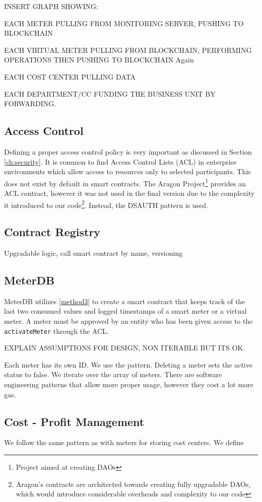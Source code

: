 INSERT GRAPH SHOWING:

EACH METER PULLING FROM MONITORING SERVER, PUSHING TO BLOCKCHAIN

EACH VIRTUAL METER PULLING FROM BLOCKCHAIN, PERFORMING OPERATIONS THEN PUSHING TO BLOCKCHAIN Again

EACH COST CENTER PULLING DATA

EACH DEPARTMENT/CC FUNDING THE BUSINESS UNIT BY FORWARDING.

\subsection{Access Control}
Defining a proper access control policy is very important as discussed in Section \ref{ch:security}. It is common to find Access Control Lists (ACL) in enterprise environments which allow access to resources only to selected participants. This does not exist by default in smart contracts. The Aragon Project\footnote{Project aimed at creating DAOs} provides an ACL contract, however it was not used in the final version due to the complexity it introduced to our code\footnote{Aragon's contracts are architected towards creating fully upgradable DAOs, which would introduce considerable overheads and complexity to our code}. Instead, the DSAUTH pattern is used.

\subsection{Contract Registry}
Upgradable logic, call smart contract by name, versioning

\subsection{MeterDB}
MeterDB utilizes \ref{method3} to create a smart contract that keeps track of the last two consumed values and logged timestamps of a smart meter or a virtual meter. A meter must be approved by an entity who has been given access to the \texttt{activateMeter} through the ACL. 

EXPLAIN ASSUMPTIONS FOR DESIGN, NON ITERABLE BUT ITS OK. 

Each meter has its own ID. We use the pattern. Deleting a meter sets the active status to false. We iterate over the array of meters. There are software engineering patterns \cite{crud} that allow more proper usage, however they cost a lot more gas. 


\subsection{Cost - Profit Management}
We follow the same pattern as with meters for storing cost centers. We define 

